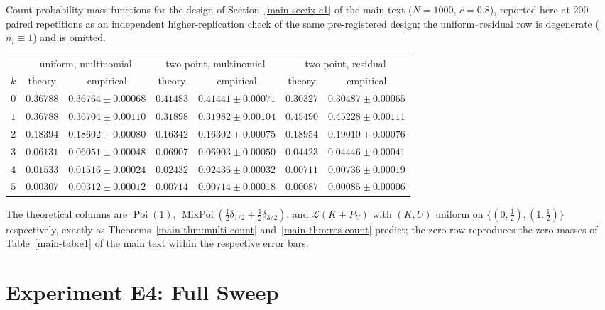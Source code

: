 \documentclass[10pt,onecolumn]{IEEEtran}
\theoremstyle{remark}
\begin{document}
Count probability mass functions for the design of Section~\ref{main-sec:ix-e1} of the
main text ($N=1000$, $c=0.8$), reported here at $200$ paired repetitions as an
independent higher-replication check of the same pre-registered design; the
uniform--residual row is degenerate ($n_i\equiv1$) and is omitted.

\begin{center}
\renewcommand{\arraystretch}{1.15}
\begin{tabular}{ccccccc}
\toprule
 & \multicolumn{2}{c}{uniform, multinomial}
 & \multicolumn{2}{c}{two-point, multinomial}
 & \multicolumn{2}{c}{two-point, residual} \\
\cmidrule(lr){2-3}\cmidrule(lr){4-5}\cmidrule(lr){6-7}
$k$ & theory & empirical & theory & empirical & theory & empirical \\
\midrule
$0$ & $0.36788$ & $0.36764\pm0.00068$ & $0.41483$ & $0.41441\pm0.00071$ & $0.30327$ & $0.30487\pm0.00065$ \\
$1$ & $0.36788$ & $0.36704\pm0.00110$ & $0.31898$ & $0.31982\pm0.00104$ & $0.45490$ & $0.45228\pm0.00111$ \\
$2$ & $0.18394$ & $0.18602\pm0.00080$ & $0.16342$ & $0.16302\pm0.00075$ & $0.18954$ & $0.19010\pm0.00076$ \\
$3$ & $0.06131$ & $0.06051\pm0.00048$ & $0.06907$ & $0.06903\pm0.00050$ & $0.04423$ & $0.04446\pm0.00041$ \\
$4$ & $0.01533$ & $0.01516\pm0.00024$ & $0.02432$ & $0.02436\pm0.00032$ & $0.00711$ & $0.00736\pm0.00019$ \\
$5$ & $0.00307$ & $0.00312\pm0.00012$ & $0.00714$ & $0.00714\pm0.00018$ & $0.00087$ & $0.00085\pm0.00006$ \\
\bottomrule
\end{tabular}
\end{center}

The theoretical columns are $\operatorname{Poi}(1)$,
$\operatorname{MixPoi}(\tfrac12\delta_{1/2}+\tfrac12\delta_{3/2})$, and
$\mathcal L(K+P_U)$ with $(K,U)$ uniform on $\{(0,\tfrac12),(1,\tfrac12)\}$
respectively, exactly as Theorems~\ref{main-thm:multi-count}
and~\ref{main-thm:res-count} predict; the zero row reproduces the
zero masses of Table~\ref{main-tab:e1} of the main text within the respective error bars.

\section{Experiment E4: Full Sweep}\label{sec:S26}
\end{document}
